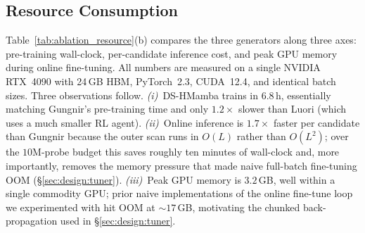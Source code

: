\documentclass[conference]{IEEEtran}
\begin{document}
\subsection{Resource Consumption}\label{sec:eval:resource}
Table~\ref{tab:ablation_resource}(b) compares the three
generators along three axes: pre-training wall-clock,
per-candidate inference cost, and peak GPU memory during online
fine-tuning.  All numbers are measured on a single NVIDIA
RTX~4090 with 24\,GB HBM, PyTorch~2.3, CUDA~12.4, and identical
batch sizes.  Three observations follow.
\emph{(i)}~DS-HMamba trains in $6.8$\,h, essentially matching
Gungnir's pre-training time and only $1.2\times$ slower than
Luori (which uses a much smaller RL agent).
\emph{(ii)}~Online inference is $1.7\times$ faster per candidate
than Gungnir because the outer scan runs in $O(L)$ rather than
$O(L^2)$; over the $10$M-probe budget this saves roughly ten
minutes of wall-clock and, more importantly, removes the memory
pressure that made naive full-batch fine-tuning OOM
(\S\ref{sec:design:tuner}).
\emph{(iii)}~Peak GPU memory is $3.2$\,GB, well within a single
commodity GPU; prior naive implementations of the online
fine-tune loop we experimented with hit OOM at $\sim\!17$\,GB,
motivating the chunked back-propagation used in
\S\ref{sec:design:tuner}.
\end{document}
